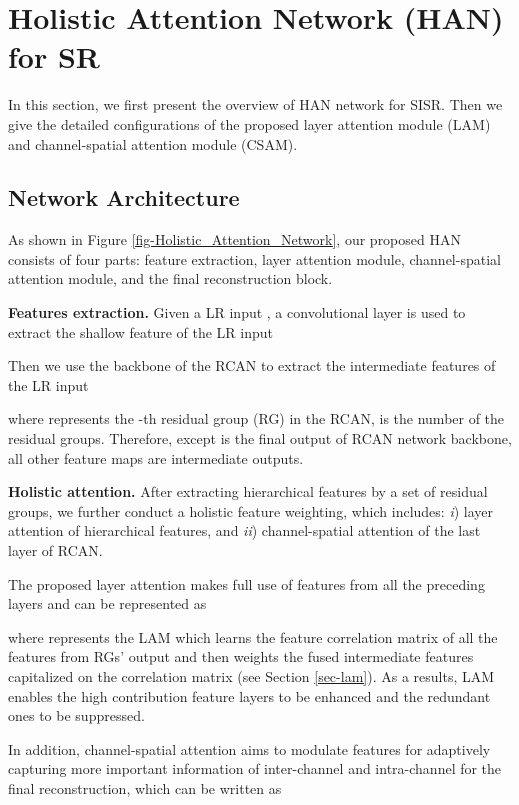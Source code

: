 \documentclass[runningheads]{llncs}
\begin{document}
\section{Holistic Attention Network (HAN) for SR}
\label{sec-att}
In this section, we first present the overview of HAN network for SISR. Then we give the detailed configurations of the proposed layer attention module (LAM) and channel-spatial attention module (CSAM).  




\subsection{Network Architecture}
As shown in Figure \ref{fig-Holistic_Attention_Network}, our proposed HAN consists of four parts: feature extraction, layer attention module, channel-spatial attention module, and the final reconstruction block.


\textbf{Features extraction.} Given a LR input , a convolutional layer is used to extract the shallow feature  of the LR input

Then we use the backbone of the RCAN \cite{zhang2018image} to extract the intermediate features  of the LR input

where  represents the -th residual group (RG) in the RCAN,  is the number of the residual groups. Therefore, except  is the final output of RCAN network backbone, all other feature maps are intermediate outputs.



\textbf{Holistic attention.} After extracting hierarchical features  by a set of residual groups, we further conduct a holistic feature weighting, which includes: \textit{i}) layer attention of hierarchical features, and \textit{ii}) channel-spatial attention of the last layer of RCAN. 

The proposed layer attention makes full use of features from all the preceding layers and can be represented as

where  represents the LAM which learns the feature correlation matrix of all the features from RGs' output and then weights the fused intermediate features  capitalized on the correlation matrix (see Section \ref{sec-lam}). As a results, LAM enables the high contribution feature layers to be enhanced and the redundant ones to be suppressed.


	In addition, channel-spatial attention aims to modulate features for adaptively capturing more important information of inter-channel and intra-channel for the final reconstruction, which can be written as
\end{document}
